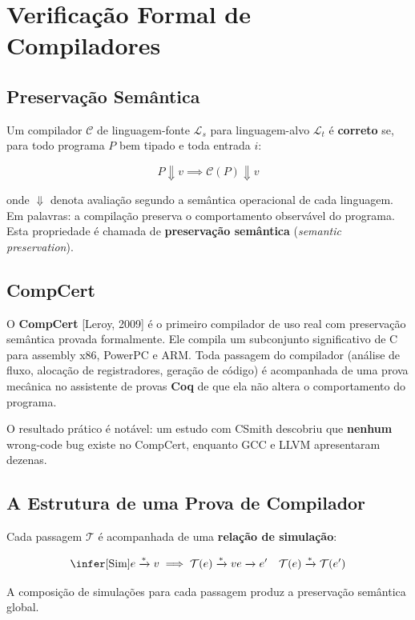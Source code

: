 \section{Verificação Formal de Compiladores}

\subsection{Preservação Semântica}

Um compilador \(\mathcal{C}\) de linguagem-fonte \(\mathcal{L}_s\) para
linguagem-alvo \(\mathcal{L}_t\) é \textbf{correto} se, para todo
programa \(P\) bem tipado e toda entrada \(i\):

\[
P \Downarrow v \implies \mathcal{C}(P) \Downarrow v
\]

onde \(\Downarrow\) denota avaliação segundo a semântica operacional de
cada linguagem. Em palavras: a compilação preserva o comportamento
observável do programa. Esta propriedade é chamada de
\textbf{preservação semântica} (\emph{semantic preservation}).

\subsection{CompCert}

O \textbf{CompCert} [Leroy, 2009] é o primeiro compilador de uso real
com preservação semântica provada formalmente. Ele compila um
subconjunto significativo de C para assembly x86, PowerPC e ARM. Toda
passagem do compilador (análise de fluxo, alocação de
registradores, geração de código) é acompanhada de uma prova
mecânica no assistente de provas \textbf{Coq} de que ela não altera o
comportamento do programa.

O resultado prático é notável: um estudo com CSmith descobriu que
\textbf{nenhum} wrong-code bug existe no CompCert, enquanto GCC e LLVM
apresentaram dezenas.

\subsection{A Estrutura de uma Prova de Compilador}

Cada passagem \(\mathcal{T}\) é acompanhada de uma \textbf{relação de
simulação}:

\[
\infer[\text{Sim}]
  {e \xrightarrow{*} v \implies \mathcal{T}(e) \xrightarrow{*} v}
  {e \xrightarrow{} e' \quad \mathcal{T}(e) \xrightarrow{*} \mathcal{T}(e')}
\]

A composição de simulações para cada passagem produz a preservação
semântica global.

